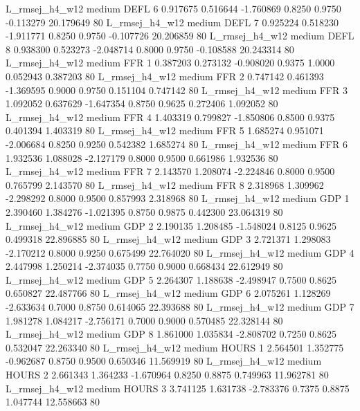 L_rmsej_h4_w12     medium     DEFL                 6  0.917675 0.516644 -1.760869 0.8250 0.9750 -0.113279   20.179649 80
L_rmsej_h4_w12     medium     DEFL                 7  0.925224 0.518230 -1.911771 0.8250 0.9750 -0.107726   20.206859 80
L_rmsej_h4_w12     medium     DEFL                 8  0.938300 0.523273 -2.048714 0.8000 0.9750 -0.108588   20.243314 80
L_rmsej_h4_w12     medium      FFR                 1  0.387203 0.273132 -0.908020 0.9375 1.0000  0.052943    0.387203 80
L_rmsej_h4_w12     medium      FFR                 2  0.747142 0.461393 -1.369595 0.9000 0.9750  0.151104    0.747142 80
L_rmsej_h4_w12     medium      FFR                 3  1.092052 0.637629 -1.647354 0.8750 0.9625  0.272406    1.092052 80
L_rmsej_h4_w12     medium      FFR                 4  1.403319 0.799827 -1.850806 0.8500 0.9375  0.401394    1.403319 80
L_rmsej_h4_w12     medium      FFR                 5  1.685274 0.951071 -2.006684 0.8250 0.9250  0.542382    1.685274 80
L_rmsej_h4_w12     medium      FFR                 6  1.932536 1.088028 -2.127179 0.8000 0.9500  0.661986    1.932536 80
L_rmsej_h4_w12     medium      FFR                 7  2.143570 1.208074 -2.224846 0.8000 0.9500  0.765799    2.143570 80
L_rmsej_h4_w12     medium      FFR                 8  2.318968 1.309962 -2.298292 0.8000 0.9500  0.857993    2.318968 80
L_rmsej_h4_w12     medium      GDP                 1  2.390460 1.384276 -1.021395 0.8750 0.9875  0.442300   23.064319 80
L_rmsej_h4_w12     medium      GDP                 2  2.190135 1.208485 -1.548024 0.8125 0.9625  0.499318   22.896885 80
L_rmsej_h4_w12     medium      GDP                 3  2.721371 1.298083 -2.170212 0.8000 0.9250  0.675499   22.764020 80
L_rmsej_h4_w12     medium      GDP                 4  2.447998 1.250214 -2.374035 0.7750 0.9000  0.668434   22.612949 80
L_rmsej_h4_w12     medium      GDP                 5  2.264307 1.188638 -2.498947 0.7500 0.8625  0.650827   22.487766 80
L_rmsej_h4_w12     medium      GDP                 6  2.075261 1.128269 -2.633634 0.7000 0.8750  0.614065   22.393688 80
L_rmsej_h4_w12     medium      GDP                 7  1.981278 1.084217 -2.756171 0.7000 0.9000  0.570485   22.328144 80
L_rmsej_h4_w12     medium      GDP                 8  1.861000 1.035834 -2.808702 0.7250 0.8625  0.532047   22.263340 80
L_rmsej_h4_w12     medium    HOURS                 1  2.564501 1.352775 -0.962687 0.8750 0.9500  0.650346   11.569919 80
L_rmsej_h4_w12     medium    HOURS                 2  2.661343 1.364233 -1.670964 0.8250 0.8875  0.749963   11.962781 80
L_rmsej_h4_w12     medium    HOURS                 3  3.741125 1.631738 -2.783376 0.7375 0.8875  1.047744   12.558663 80
